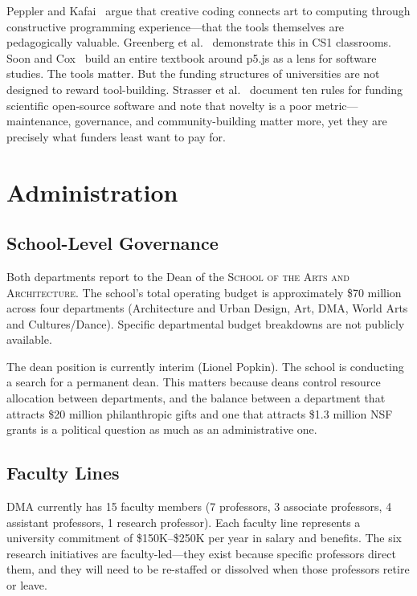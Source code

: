 \documentclass[10pt,letterpaper,twocolumn]{article}
\newcommand{\dma}{\textsc{DMA}}
\newcommand{\sofa}{\textsc{School of the Arts and Architecture}}
\begin{document}
Peppler and Kafai~\citep{peppler2009creative} argue that creative coding connects art to computing through constructive programming experience---that the tools themselves are pedagogically valuable. Greenberg et al.~\citep{greenberg2012creative} demonstrate this in CS1 classrooms. Soon and Cox~\citep{soon2020aesthetic} build an entire textbook around p5.js as a lens for software studies. The tools matter. But the funding structures of universities are not designed to reward tool-building. Strasser et al.~\citep{strasser2022funding} document ten rules for funding scientific open-source software and note that novelty is a poor metric---maintenance, governance, and community-building matter more, yet they are precisely what funders least want to pay for.

\section{Administration}

\subsection{School-Level Governance}

Both departments report to the Dean of the \sofa{}. The school's total operating budget is approximately \$70 million across four departments (Architecture and Urban Design, Art, \dma{}, World Arts and Cultures/Dance). Specific departmental budget breakdowns are not publicly available.

The dean position is currently interim (Lionel Popkin). The school is conducting a search for a permanent dean. This matters because deans control resource allocation between departments, and the balance between a department that attracts \$20 million philanthropic gifts and one that attracts \$1.3 million NSF grants is a political question as much as an administrative one.

\subsection{Faculty Lines}

\dma{} currently has 15 faculty members (7 professors, 3 associate professors, 4 assistant professors, 1 research professor). Each faculty line represents a university commitment of \$150K--\$250K per year in salary and benefits. The six research initiatives are faculty-led---they exist because specific professors direct them, and they will need to be re-staffed or dissolved when those professors retire or leave.
\end{document}

